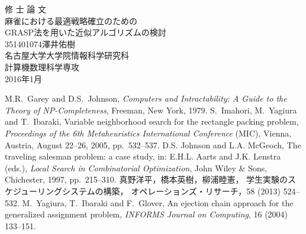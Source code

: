 \documentclass[uplatex]{ujreport}
\begin{document}
\begin{table}[b]
\begin{center}
{\huge 修\hspace{0.1cm} 士\hspace{0.1cm} 論\hspace{0.1cm} 文}\\[2.5cm]
{\huge 麻雀における最適戦略確立のための\\GRASP法を用いた近似アルゴリズムの検討}\\[6cm]
{\huge 351401074\qquad 澤井佑樹}\\[1cm]
{\huge 名古屋大学大学院情報科学研究科}\\[0.5cm]
{\huge 計算機数理科学専攻}\\[0.5cm]
{\huge 2016年1月}\\
\end{center}
\end{table} 


\thispagestyle{empty} 
\clearpage
\newpage
{}
\setcounter{page}{1}







\thispagestyle{empty} 
\tableofcontents
\newpage
\setcounter{page}{1}
\pagestyle{plain}















\begin{thebibliography}{99}
  M.R.~Garey and D.S.~Johnson,
	 {\it Computers and Intractability: A Guide to the Theory of NP-Completeness},
	 Freeman, New York, 1979.
  S.~Imahori, M.~Yagiura and T.~Ibaraki,
	 Variable neighborhood search for the rectangle packing problem,
         {\it Proceedings of the 6th Metaheuristics International Conference} (MIC),
	 Vienna, Austria, August 22--26, 2005, pp.~532--537.
  D.S. Johnson and L.A. McGeoch,
	 The traveling salesman problem: a case study,
	 in: E.H.L. Aarts and J.K. Lenstra (eds.),
	 {\it Local Search in Combinatorial Optimization},
	 John Wiley \& Sons, Chichester, 1997, pp.~215--310.
  真野洋平，橋本英樹，柳浦睦憲，
	 学生実験のスケジューリングシステムの構築，
	 オペレーションズ・リサーチ，58 (2013) 524--532.
  M.~Yagiura, T.~Ibaraki and F.~Glover, 
	 An ejection chain approach for the generalized assignment problem,
	 {\it INFORMS Journal on Computing}, 16 (2004) 133--151.
\end{thebibliography}
\end{document}
